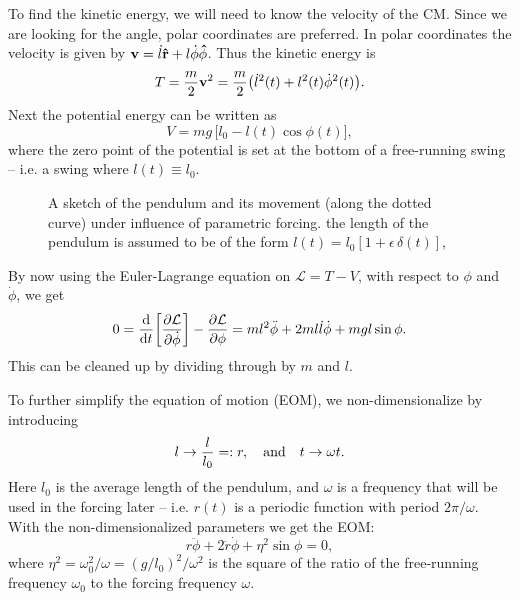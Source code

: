 \documentclass[11pt,letter, swedish, english,%
]{article}
\begin{document}
To find the kinetic energy, we will need to know the velocity of the
CM. Since we are looking for the angle, polar coordinates
are preferred. In polar coordinates the velocity is given by
$\vb{v}=\dot{l}\vu{r}+l\dot{\phi}\vu{\phi}$. Thus the kinetic energy is
\begin{equation}
T=\frac{m}{2}\vb{v}^2=\frac{m}{2}\qty(\dot{l}^2(t)+l^2(t)\dot{\phi}^2(t)).
\end{equation}
Next the potential energy can be written as
\begin{equation}
V=mg\,\Big[l_0-l(t)\cos\phi(t)\Big],
\end{equation}
where the zero point of the potential is set at the bottom of a
free-running swing -- i.e. a swing where $l(t)\equiv l_0$. 

\begin{figure}\centering
\resizebox{.2\textwidth}{!}{}
\caption{A sketch of the pendulum and its movement (along the dotted
  curve) under influence of parametric forcing. the length of the
  pendulum is assumed to be of the 
form $l(t)=l_0[1+\epsilon\,\delta(t)]$, 
}
\label{fig:pendulum}
\end{figure}

By now using the Euler-Lagrange equation on $\mathcal{L}=T-V$, with
 respect to $\phi$ and $\dot\phi$, we get
\begin{equation}
0=\dv{t}\qty[\pdv{\mathcal{L}}{\dot{\phi}}]-\pdv{\mathcal{L}}{\phi}
=ml^2\ddot\phi +2ml\dot{l}\dot\phi +mgl\sin\phi.
\end{equation}
This can be cleaned up by dividing through by $m$ and $l$. 

To further simplify the equation of motion (EOM), we
non-dimensionalize by introducing
\begin{equation}\label{eq:non-dim}
l\to \frac{l}{l_0}=:r\qcomma\text{and}\quad
t\to\omega t.
\end{equation}
Here $l_0$ is the average length of the pendulum, and $\omega$ is a
frequency that will be used in the forcing later -- i.e. $r(t)$ is a
periodic function with period $2\pi/\omega$. 
With the non-dimensionalized parameters we get the EOM:
\begin{equation}\label{eq:eom}
r\ddot\phi+2\dot{r}\dot\phi + \eta^2\sin\phi=0,
\end{equation}
where %
$\eta^2=\omega_0^2/\omega=(g/l_0)^2/\omega^2$ is the square of the
ratio of the free-running frequency $\omega_0$ to the forcing
frequency $\omega$. 
\end{document}
